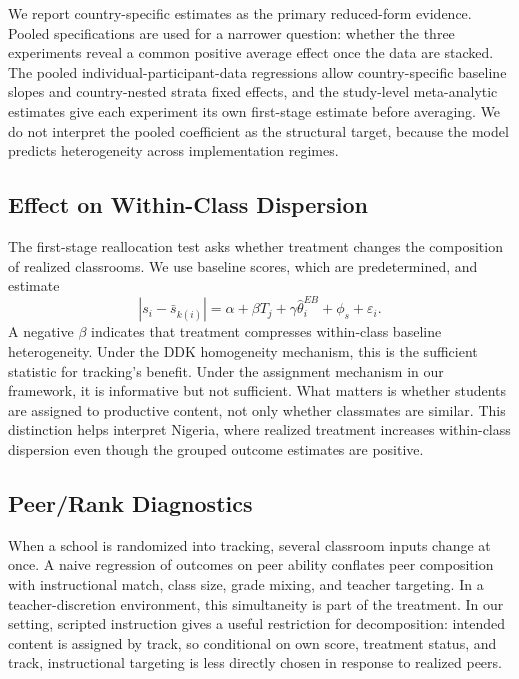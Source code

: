 \documentclass[11pt]{article}
\begin{document}
We report country-specific estimates as the primary reduced-form evidence. Pooled specifications are used for a narrower question: whether the three experiments reveal a common positive average effect once the data are stacked. The pooled individual-participant-data regressions allow country-specific baseline slopes and country-nested strata fixed effects, and the study-level meta-analytic estimates give each experiment its own first-stage estimate before averaging. We do not interpret the pooled coefficient as the structural target, because the model predicts heterogeneity across implementation regimes.

\subsection{Effect on Within-Class Dispersion}

The first-stage reallocation test asks whether treatment changes the composition of realized classrooms. We use baseline scores, which are predetermined, and estimate
\begin{equation}
|s_i - \bar{s}_{k(i)}| = \alpha + \beta T_j + \gamma \hat{\theta}^{EB}_i + \phi_s + \varepsilon_i.
\end{equation}
A negative $\beta$ indicates that treatment compresses within-class baseline heterogeneity. Under the DDK homogeneity mechanism, this is the sufficient statistic for tracking's benefit. Under the assignment mechanism in our framework, it is informative but not sufficient. What matters is whether students are assigned to productive content, not only whether classmates are similar. This distinction helps interpret Nigeria, where realized treatment increases within-class dispersion even though the grouped outcome estimates are positive.

\subsection{Peer/Rank Diagnostics}
\label{sec:bh}

When a school is randomized into tracking, several classroom inputs change at once. A naive regression of outcomes on peer ability conflates peer composition with instructional match, class size, grade mixing, and teacher targeting. In a teacher-discretion environment, this simultaneity is part of the treatment. In our setting, scripted instruction gives a useful restriction for decomposition: intended content is assigned by track, so conditional on own score, treatment status, and track, instructional targeting is less directly chosen in response to realized peers.
\end{document}
